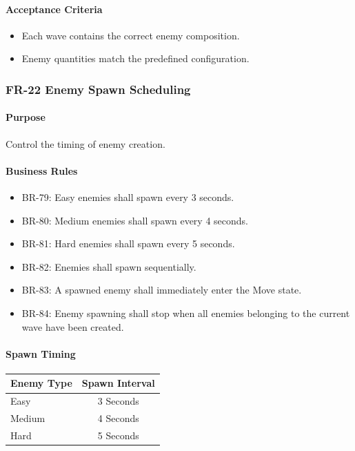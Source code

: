 \documentclass[11pt,a4paper]{article}
\begin{document}
\paragraph{Acceptance Criteria}
\begin{itemize}
  \item Each wave contains the correct enemy composition.
  \item Enemy quantities match the predefined configuration.
\end{itemize}

\subsubsection{FR-22 Enemy Spawn Scheduling}

\paragraph{Purpose}
Control the timing of enemy creation.

\paragraph{Business Rules}
\begin{itemize}
  \item BR-79: Easy enemies shall spawn every 3 seconds.
  \item BR-80: Medium enemies shall spawn every 4 seconds.
  \item BR-81: Hard enemies shall spawn every 5 seconds.
  \item BR-82: Enemies shall spawn sequentially.
  \item BR-83: A spawned enemy shall immediately enter the Move state.
  \item BR-84: Enemy spawning shall stop when all enemies belonging to the
        current wave have been created.
\end{itemize}

\paragraph{Spawn Timing}
\begin{center}
\begin{tabular}{lc}
  \toprule
  \textbf{Enemy Type} & \textbf{Spawn Interval} \\
  \midrule
  Easy   & 3 Seconds \\
  Medium & 4 Seconds \\
  Hard   & 5 Seconds \\
  \bottomrule
\end{tabular}
\end{center}
\end{document}

